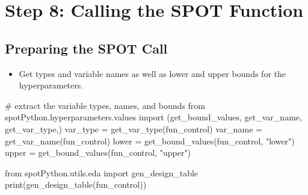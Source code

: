 \documentclass[
  letterpaper,
  DIV=11,
  numbers=noendperiod]{scrreprt}
\newenvironment{Shaded}{\begin{snugshade}}{\end{snugshade}}
\newcommand{\BuiltInTok}[1]{\textcolor[rgb]{0.00,0.23,0.31}{#1}}
\newcommand{\CommentTok}[1]{\textcolor[rgb]{0.37,0.37,0.37}{#1}}
\newcommand{\ImportTok}[1]{\textcolor[rgb]{0.00,0.46,0.62}{#1}}
\newcommand{\NormalTok}[1]{\textcolor[rgb]{0.00,0.23,0.31}{#1}}
\newcommand{\OperatorTok}[1]{\textcolor[rgb]{0.37,0.37,0.37}{#1}}
\newcommand{\StringTok}[1]{\textcolor[rgb]{0.13,0.47,0.30}{#1}}
\providecommand{\tightlist}{%
  \setlength{\itemsep}{0pt}\setlength{\parskip}{0pt}}\usepackage{longtable,booktabs,array}
\begin{document}
\hypertarget{step-8-calling-the-spot-function-1}{%
\section{Step 8: Calling the SPOT
Function}\label{step-8-calling-the-spot-function-1}}

\hypertarget{sec-prepare-spot-call-16}{%
\subsection{Preparing the SPOT Call}\label{sec-prepare-spot-call-16}}

\begin{itemize}
\tightlist
\item
  Get types and variable names as well as lower and upper bounds for the
  hyperparameters.
\end{itemize}

\begin{Shaded}
\begin{Highlighting}[]
\CommentTok{\# extract the variable types, names, and bounds}
\ImportTok{from}\NormalTok{ spotPython.hyperparameters.values }\ImportTok{import}\NormalTok{ (get\_bound\_values,}
\NormalTok{    get\_var\_name,}
\NormalTok{    get\_var\_type,)}
\NormalTok{var\_type }\OperatorTok{=}\NormalTok{ get\_var\_type(fun\_control)}
\NormalTok{var\_name }\OperatorTok{=}\NormalTok{ get\_var\_name(fun\_control)}
\NormalTok{lower }\OperatorTok{=}\NormalTok{ get\_bound\_values(fun\_control, }\StringTok{"lower"}\NormalTok{)}
\NormalTok{upper }\OperatorTok{=}\NormalTok{ get\_bound\_values(fun\_control, }\StringTok{"upper"}\NormalTok{)}
\end{Highlighting}
\end{Shaded}

\begin{Shaded}
\begin{Highlighting}[]
\ImportTok{from}\NormalTok{ spotPython.utils.eda }\ImportTok{import}\NormalTok{ gen\_design\_table}
\BuiltInTok{print}\NormalTok{(gen\_design\_table(fun\_control))}
\end{Highlighting}
\end{Shaded}
\end{document}
